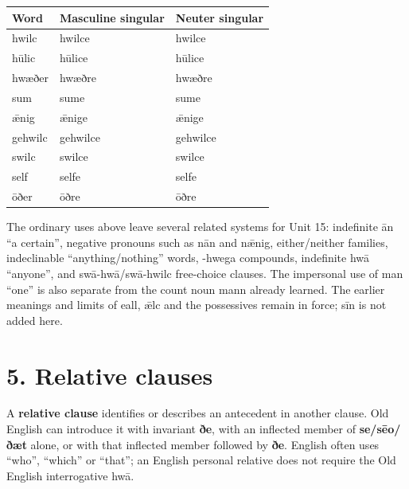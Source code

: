 \par\begingroup
\fontsize{10.5}{13.2}\selectfont
\setlength{\LTleft}{0pt}\setlength{\LTright}{\fill}
\noindent
\begin{tabular}{@{}>{\raggedright\arraybackslash}p{34.61mm}>{\raggedright\arraybackslash}p{45.17mm}>{\raggedright\arraybackslash}p{38.59mm}@{}}
\toprule
\textbf{Word} & \textbf{Masculine singular} & \textbf{Neuter singular} \\
\midrule
hwilc & hwilce & hwilce \\
hūlic & hūlice & hūlice \\
hwæðer & hwæðre & hwæðre \\
sum & sume & sume \\
ǣnig & ǣnige & ǣnige \\
gehwilc & gehwilce & gehwilce \\
swilc & swilce & swilce \\
self & selfe & selfe \\
ōðer & ōðre & ōðre \\
\bottomrule
\end{tabular}
\par\endgroup

The ordinary uses above leave several related systems for Unit 15: indefinite ān “a certain”, negative pronouns such as nān and nǣnig, either/\allowbreak{}neither families, indeclinable “anything/\allowbreak{}nothing” words, -hwega compounds, indefinite hwā “anyone”, and swā-hwā/\allowbreak{}swā-hwilc free-choice clauses. The impersonal use of man “one” is also separate from the count noun mann already learned. The earlier meanings and limits of eall, ǣlc and the possessives remain in force; sīn is not added here.

\section*{5. Relative clauses}

A \textbf{relative clause} identifies or describes an antecedent in another clause. Old English can introduce it with invariant \textbf{ðe}, with an inflected member of \textbf{se/\allowbreak{}sēo/\allowbreak{}ðæt} alone, or with that inflected member followed by \textbf{ðe}. English often uses “who”, “which” or “that”; an English personal relative does not require the Old English interrogative hwā.

